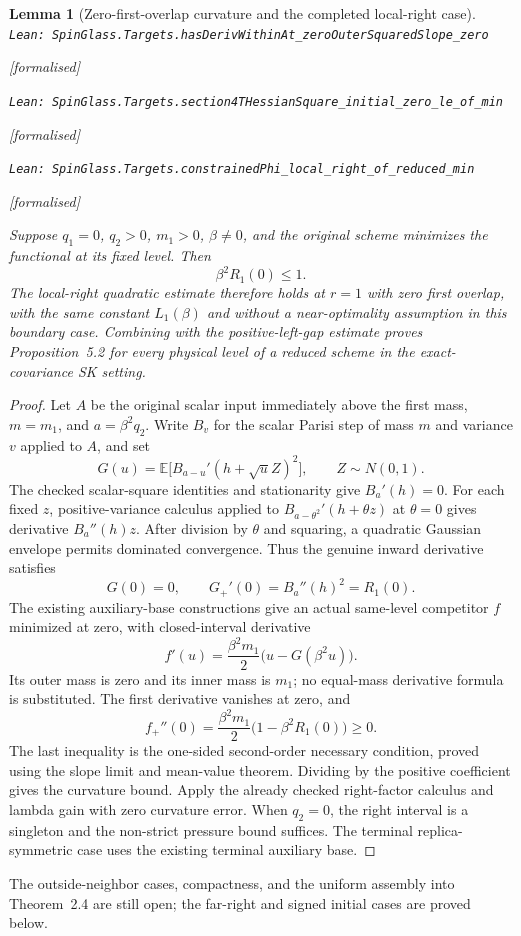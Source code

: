 \documentclass[11pt]{article}
\providecommand{\lean}[1]{\leavevmode\par\nopagebreak
  {\noindent\normalfont\footnotesize\raggedright\texttt{Lean: #1}\par}\nopagebreak}
\providecommand{\leanok}{\par\nopagebreak
  {\noindent\normalfont\footnotesize\textcolor{green!50!black}{[formalised]}\par}\nopagebreak}
\newtheorem{lemma}[theorem]{Lemma}
\begin{document}
\begin{lemma}[Zero-first-overlap curvature and the completed local-right case]
\lean{SpinGlass.Targets.hasDerivWithinAt\_zeroOuterSquaredSlope\_zero}\leanok
\lean{SpinGlass.Targets.section4THessianSquare\_initial\_zero\_le\_of\_min}\leanok
\lean{SpinGlass.Targets.constrainedPhi\_local\_right\_of\_reduced\_min}\leanok
Suppose $q_1=0$, $q_2>0$, $m_1>0$, $\beta\ne0$, and the original scheme
minimizes the functional at its fixed level. Then
\[
 \beta^2R_1(0)\le1.
\]
The local-right quadratic estimate therefore holds at $r=1$ with zero first
overlap, with the same constant $L_1(\beta)$ and without a near-optimality
assumption in this boundary case. Combining with the positive-left-gap
estimate proves Proposition~5.2 for every physical level of a reduced scheme
in the exact-covariance SK setting.
\end{lemma}
\begin{proof}
Let $A$ be the original scalar input immediately above the first mass,
$m=m_1$, and $a=\beta^2q_2$. Write $B_v$ for the scalar Parisi step of
mass $m$ and variance $v$ applied to $A$, and set
\[
 G(u)=\mathbb E\bigl[B_{a-u}'(h+\sqrt{u}Z)^2\bigr],\qquad Z\sim N(0,1).
\]
The checked scalar-square identities and stationarity give $B_a'(h)=0$.
For each fixed $z$, positive-variance calculus applied to
$B_{a-\theta^2}'(h+\theta z)$ at $\theta=0$ gives derivative $B_a''(h)z$.
After division by $\theta$ and squaring, a quadratic Gaussian envelope
permits dominated convergence. Thus the genuine inward derivative satisfies
\[
 G(0)=0,\qquad G_+'(0)=B_a''(h)^2=R_1(0).
\]
The existing auxiliary-base constructions give an actual same-level
competitor $f$ minimized at zero, with closed-interval derivative
\[
 f'(u)=\frac{\beta^2m_1}{2}\bigl(u-G(\beta^2u)\bigr).
\]
Its outer mass is zero and its inner mass is $m_1$; no equal-mass derivative
formula is substituted. The first derivative vanishes at zero, and
\[
 f_+''(0)=\frac{\beta^2m_1}{2}\bigl(1-\beta^2R_1(0)\bigr)\ge0.
\]
The last inequality is the one-sided second-order necessary condition,
proved using the slope limit and mean-value theorem. Dividing by the positive
coefficient gives the curvature bound. Apply the already checked right-factor
calculus and lambda gain with zero curvature error. When $q_2=0$, the right
interval is a singleton and the non-strict pressure bound suffices.
The terminal replica-symmetric case uses the existing terminal auxiliary base.
\end{proof}
The outside-neighbor cases, compactness, and the uniform assembly into
Theorem~2.4 are still open; the far-right and signed initial cases are proved below.
\end{document}
